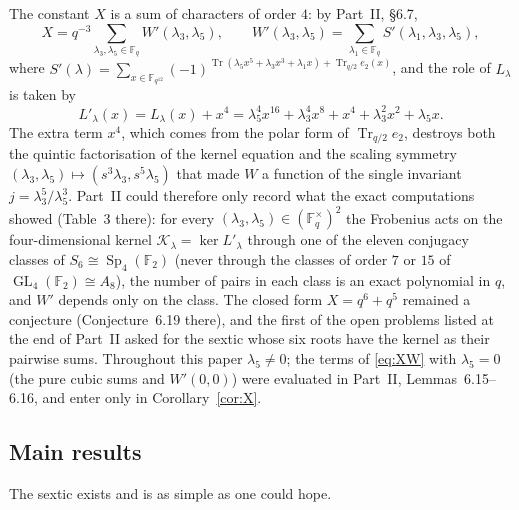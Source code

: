 \documentclass[12pt,a4paper]{amsart}
\theoremstyle{definition}
\newcommand{\F}{\mathbb{F}}
\newcommand{\Tr}{\operatorname{Tr}}
\newcommand{\Sp}{\operatorname{Sp}}
\newcommand{\GL}{\operatorname{GL}}
\newcommand{\Kk}{\mathcal{K}}
\begin{document}
The constant $X$ is a sum of characters of order $4$: by Part~II, \S6.7,
\begin{equation}\label{eq:XW}
X=q^{-3}\sum_{\lambda_3,\lambda_5\in\F_q}W'(\lambda_3,\lambda_5),\qquad W'(\lambda_3,\lambda_5)=\sum_{\lambda_1\in\F_q}S'(\lambda_1,\lambda_3,\lambda_5),
\end{equation}
where $S'(\lambda)=\sum_{x\in\F_{q^{12}}}(-1)^{\Tr(\lambda_5x^5+\lambda_3x^3+\lambda_1x)+\Tr_{q/2}e_2(x)}$, and the role of $L_\lambda$ is taken by
\begin{equation}\label{eq:Lp}
L'_\lambda(x)=L_\lambda(x)+x^4=\lambda_5^4x^{16}+\lambda_3^4x^8+x^4+\lambda_3^2x^2+\lambda_5x .
\end{equation}
The extra term $x^4$, which comes from the polar form of $\Tr_{q/2}e_2$, destroys both the quintic factorisation of the kernel equation and the scaling symmetry $(\lambda_3,\lambda_5)\mapsto(s^3\lambda_3,s^5\lambda_5)$ that made $W$ a function of the single invariant $j=\lambda_3^5/\lambda_5^3$. Part~II could therefore only record what the exact computations showed (Table~3 there): for every $(\lambda_3,\lambda_5)\in(\F_q^\times)^2$ the Frobenius acts on the four-dimensional kernel $\Kk_\lambda=\ker L'_\lambda$ through one of the eleven conjugacy classes of $S_6\cong\Sp_4(\F_2)$ (never through the classes of order $7$ or $15$ of $\GL_4(\F_2)\cong A_8$), the number of pairs in each class is an exact polynomial in $q$, and $W'$ depends only on the class. The closed form $X=q^6+q^5$ remained a conjecture (Conjecture~6.19 there), and the first of the open problems listed at the end of Part~II asked for the sextic whose six roots have the kernel as their pairwise sums. Throughout this paper $\lambda_5\ne0$; the terms of \eqref{eq:XW} with $\lambda_5=0$ (the pure cubic sums and $W'(0,0)$) were evaluated in Part~II, Lemmas~6.15--6.16, and enter only in Corollary~\ref{cor:X}.

\subsection{Main results}
The sextic exists and is as simple as one could hope.
\end{document}
